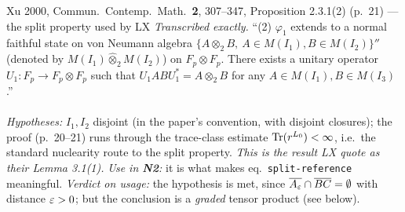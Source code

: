 \documentclass[11pt]{article}
\newcommand{\NII}{\textbf{N2}}
\newcommand{\loc}[1]{{\small\texttt{#1}}}
\newcommand{\1}{\mathbf 1}
\begin{document}
\begin{citedbox}{Xu 2000, Commun.\ Contemp.\ Math.\ \textbf{2}, 307--347, Proposition 2.3.1(2) (p.~21) --- the split property used by LX}
\emph{Transcribed exactly.} ``(2) $\varphi_1$ extends to a normal faithful state on von Neumann
algebra $\{A\otimes_2B,\ A\in M(I_1),B\in M(I_2)\}''$ (denoted by $M(I_1)\widehat\otimes_2M(I_2)$) on
$F_p\otimes F_p$. There exists a unitary operator $U_1:F_p\to F_p\otimes F_p$ such that
$U_1ABU_1^*=A\otimes_2B$ for any $A\in M(I_1),B\in M(I_3)$.''\\[2pt]
\\
\emph{Hypotheses:} $I_1,I_2$ disjoint (in the paper's convention, with disjoint closures);
the proof (p.~20--21) runs through the trace-class estimate $\operatorname{Tr}(r^{L_0})<\infty$, i.e.\ the standard
nuclearity route to the split property. \emph{This is the result LX quote as their Lemma 3.1(1).}
\emph{Use in \NII:} it is what makes eq.~\loc{split-reference} meaningful.
\emph{Verdict on usage:} the hypothesis is met, since $\overline{A_\varepsilon}\cap\overline{BC}=\emptyset$
with distance $\varepsilon>0$; but the conclusion is a \emph{graded} tensor product (see below).
\end{citedbox}
\end{document}
